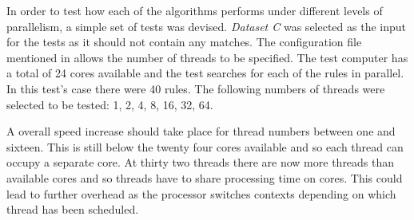 \documentclass[11pt]{article}
\begin{document}
In order to test how each of the algorithms performs under different levels of parallelism, a simple set of tests was devised. \textit{Dataset C} was selected as the input for the tests as it should not contain any matches.  The configuration file mentioned in \citet{hunt2016} allows the number of threads to be specified. The test computer has a total of 24 cores available and the test searches for each of the rules in parallel. In this test's case there were 40 rules. The following numbers of threads were selected to be tested: 1, 2, 4, 8, 16, 32, 64.

A overall speed increase should take place for thread numbers between one and sixteen. This is still below the twenty four cores available and so each thread can occupy a separate core. At thirty two threads there are now more threads than available cores and so threads have to share processing time on cores. This could lead to further overhead as the processor switches contexts depending on which thread has been scheduled.
\end{document}
